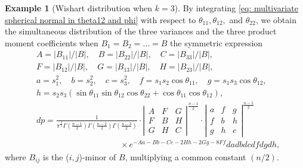 \documentclass{amsart}
\theoremstyle{definition}
\newtheorem{example}[theorem]{Example}
\numberwithin{equation}{section}
\begin{document}
\begin{example}[Wishart distribution when $k=3$]

By integrating \eqref{eq: multivariate spherical normal in theta12 and phi} with respect to $\theta_{11},\theta_{12},$ and $\theta_{22}$, we obtain the simultaneous distribution of the three variances and the three product moment coefficients when $ B_{1} =  B_2 = \dots =  B$ the symmetric expression
\begin{equation}    \begin{aligned}& A= {| B_{11}|}/{| B|}, \quad B= {| B_{22}|}/{| B|}, \quad C={| B_{33}|}/{| B|}, \\ &F= {| B_{12}|}/{| B|}, \quad G=  {| B_{13}|}/{| B|}, \quad H= {| B_{23}|}/{| B|}, \\&
a=s_{1}^2, \quad b=s_{2}^2,\quad c=s_{3}^2, \quad f = s_{1}s_{2}\cos \theta_{11}, \quad g = s_{1}s_{3}\cos \theta_{12}, \\&
h = s_{2}s_{3}(\sin\theta_{11}\sin \theta_{12} \cos \theta_{22} + \cos\theta_{11}\cos \theta_{12}),\\& d p=\frac{1}{\pi^{\frac{3}{2}} \Gamma (\frac{n-1}{2}) \Gamma(\frac{n-2}{2}) \Gamma(\frac{n-3}{2})}\cdot \left|\begin{array}{cccc}A & F & G \\ F & B & H \\G & H & C\end{array}\right|^{\frac{n-1}{2}} \cdot \left|\begin{array}{ccc}a & f & g \\f & b & h \\g & h & c\end{array}\right|^{\frac{n-5}{2}} \\&\qquad\qquad\qquad\qquad\qquad\times  e^{-A a-B b-C c-2 H h-2 G g-8 F f} d a d b d c d f d g d h,\end{aligned}\label{eq: Wishart}\end{equation}
where $ B_{ij}$ is the ($i,j$)-minor of $ B$, multiplying a common constant $({n}/{2})$. 



\end{example}
\end{document}
